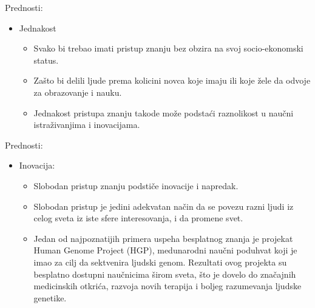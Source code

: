 \documentclass[aspectratio=1610,17pt,utf8]{beamer}
\begin{document}
	\begin{frame}{Prednosti:}
		
		\begin{itemize}
			\item Jednakost
			\begin{itemize}
				\item Svako bi trebao imati pristup znanju bez obzira na svoj socio-ekonomski status.
				\item Zašto bi delili ljude prema kolicini novca koje imaju ili koje žele da odvoje za obrazovanje i nauku.
                \item Jednakost pristupa znanju takode može podstaći raznolikost u naučni istraživanjima i inovacijama.
                
			\end{itemize}
		\end{itemize}
	\end{frame}
	
	
	\begin{frame}{Prednosti:}
		
		\begin{itemize}
			\item Inovacija:
			\begin{itemize}
				\item Slobodan pristup znanju podstiče inovacije i napredak.
				\item Slobodan pristup je jedini adekvatan način da se povezu razni ljudi iz celog sveta iz iste sfere interesovanja, i da promene svet.
                    \item Jedan od najpoznatijih primera uspeha besplatnog znanja je projekat Human Genome Project (HGP), medunarodni naučni poduhvat koji je imao za cilj da sektvenira ljudski genom. Rezultati ovog projekta su besplatno dostupni naučnicima širom sveta, što je dovelo do značajnih medicinskih otkrića, razvoja novih terapija i boljeg razumevanja ljudske genetike.
			\end{itemize}
		\end{itemize}
	\end{frame}
	
\end{document}
